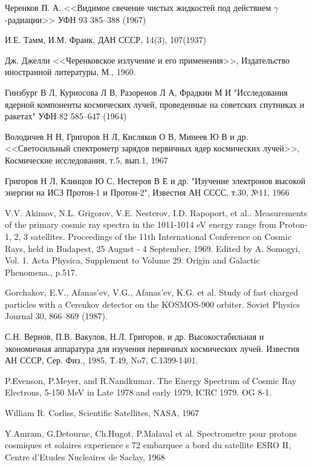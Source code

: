 \documentclass[12pt,a4paper]{report} %
\begin{document}
\begin{thebibliography}{00}

Черенков П. А. <<Видимое свечение чистых жидкостей под действием $\gamma$-радиации>> УФН 93 385–388 (1967)

И.Е. Тамм, И.М. Франк, ДАН СССР, 14(3), 107(1937)

Дж. Джелли <<Черенковское излучение и его применения>>, Издательство иностранной литературы, М., 1960.

Гинзбург В Л, Курносова Л В, Разоренов Л А, Фрадкин М И "Исследования ядерной компоненты космических лучей, проведенные на советских спутниках и ракетах" УФН 82 585–647 (1964)

Володичев Н Н, Григоров Н Л, Кисляков О В, Минеев Ю В и др. <<Светосильный спектрометр зарядов первичных ядер космических лучей>>, Космические исследования, т.5, вып.1, 1967 

Григоров Н Л, Клинцов Ю С, Нестеров В Е и др. "Изучение электронов высокой энергии на ИСЗ Протон-1 и Протон-2", Известия АН СССС, т.30, №11, 1966

V.V. Akimov, N.L. Grigorov, V.E. Nesterov, I.D. Rapoport, et al.. Measurements of the primary cosmic ray spectra in the 1011-1014 eV energy range from Proton-1, 2, 3 satellites. Proceedings of the 11th International Conference on Cosmic Rays, held in Budapest, 25 August - 4 September, 1969. Edited by A. Somogyi, Vol. 1. Acta Physica, Supplement to Volume 29. Origin and Galactic Phenomena., p.517.

Gorchakov, E.V., Afanas'ev, V.G., Afanas'ev, K.G. et al. Study of fast charged particles with a Cerenkov detector on the KOSMOS-900 orbiter. Soviet Physics Journal 30, 866–869 (1987).

С.Н. Вернов, П.В. Вакулов, Н.Л. Григоров, и др. Высокостабильная и экономичная аппаратура для изучения первичных космических лучей. Известия АН СССР, Сер. Физ., 1985, Т.49, No7, С.1399-1401.

P.Evenson, P.Meyer, and R.Nandkumar. The Energy Spectrum of Cosmic Ray Electrons, 5-150 MeV in Late 1978 and early 1979, ICRC 1979. OG 8-1.

William R. Corliss, Scientific Satellites, NASA, 1967

Y.Amram, G.Detourne, Ch.Hugot, P.Malaval et al. Spectrometre pour protons cosmiques et solaires experience s 72 embarquee a bord du satellite ESRO II, Centre d'Etudes Nucleaires de Saclay, 1968


\end{thebibliography}
\end{document}

